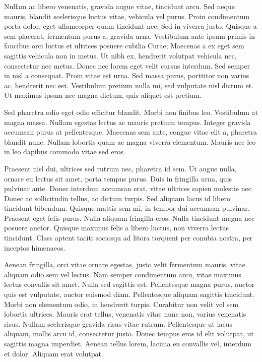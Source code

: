 \documentclass{article}
\begin{document}
Nullam ac libero venenatis, gravida augue vitae, tincidunt arcu. Sed neque mauris, blandit scelerisque luctus vitae, vehicula vel purus. Proin condimentum porta dolor, eget ullamcorper quam tincidunt nec. Sed in viverra justo. Quisque a sem placerat, fermentum purus a, gravida urna. Vestibulum ante ipsum primis in faucibus orci luctus et ultrices posuere cubilia Curae; Maecenas a ex eget sem sagittis vehicula non in metus. Ut nibh ex, hendrerit volutpat vehicula nec, consectetur nec metus. Donec nec lorem eget velit cursus interdum. Sed semper in nisl a consequat. Proin vitae est urna. Sed massa purus, porttitor non varius ac, hendrerit nec est. Vestibulum pretium nulla mi, sed vulputate nisl dictum et. Ut maximus ipsum nec magna dictum, quis aliquet est pretium.

Sed pharetra odio eget odio efficitur blandit. Morbi non finibus leo. Vestibulum at magna massa. Nullam egestas lectus ac mauris pretium tempus. Integer gravida accumsan purus at pellentesque. Maecenas sem ante, congue vitae elit a, pharetra blandit nunc. Nullam lobortis quam ac magna viverra elementum. Mauris nec leo in leo dapibus commodo vitae sed eros.

Praesent nisl dui, ultrices sed rutrum nec, pharetra id sem. Ut augue nulla, ornare eu lectus sit amet, porta tempus purus. Duis in fringilla urna, quis pulvinar ante. Donec interdum accumsan erat, vitae ultrices sapien molestie nec. Donec ac sollicitudin tellus, ac dictum turpis. Sed aliquam lacus id libero tincidunt bibendum. Quisque mattis sem mi, in tempor dui accumsan pulvinar. Praesent eget felis purus. Nulla aliquam fringilla eros. Nulla tincidunt magna nec posuere auctor. Quisque maximus felis a libero luctus, non viverra lectus tincidunt. Class aptent taciti sociosqu ad litora torquent per conubia nostra, per inceptos himenaeos.

Aenean fringilla, orci vitae ornare egestas, justo velit fermentum mauris, vitae aliquam odio sem vel lectus. Nam semper condimentum arcu, vitae maximus lectus convallis sit amet. Nulla sed sagittis est. Pellentesque magna purus, auctor quis est vulputate, auctor euismod diam. Pellentesque aliquam sagittis tincidunt. Morbi non elementum odio, in hendrerit turpis. Curabitur non velit vel sem lobortis ultrices. Mauris erat tellus, venenatis vitae nunc non, varius venenatis risus. Nullam scelerisque gravida risus vitae rutrum. Pellentesque ut lacus aliquam, mollis arcu id, consectetur justo. Donec tempus eros id elit volutpat, ut sagittis magna imperdiet. Aenean tellus lorem, lacinia eu convallis vel, interdum et dolor. Aliquam erat volutpat.
\end{document}

